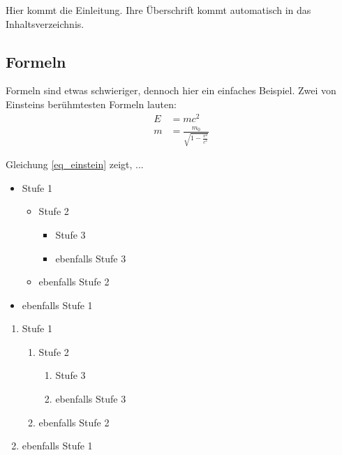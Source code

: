 \documentclass[twoside,12pt]{scrartcl}
\begin{document}
	\onehalfspacing
	
	
	Hier kommt die Einleitung. Ihre Überschrift kommt
	automatisch in das Inhaltsverzeichnis.
	
	\subsection{Formeln}
		
	Formeln sind etwas schwieriger, dennoch hier ein
	einfaches Beispiel.  Zwei von Einsteins
	berühmtesten Formeln lauten:
	\begin{align}
	E &= mc^2          \label{eq_einstein}                        \\
	m &= \frac{m_0}{\sqrt{1-\frac{v^2}{c^2}}}
	\end{align}
	
	
	Gleichung \eqref{eq_einstein} zeigt, ...
	
	\begin{itemize}
		\item Stufe 1
		\begin{itemize}
			\item Stufe 2
			\begin{itemize}
				\item Stufe 3
				\item ebenfalls Stufe 3
			\end{itemize}
			\item ebenfalls Stufe 2
		\end{itemize}
		\item ebenfalls Stufe 1
	\end{itemize}
	
		
	\begin{enumerate}
		\item Stufe 1
		\begin{enumerate}
			\item Stufe 2
			\begin{enumerate}
				\item Stufe 3
				\item ebenfalls Stufe 3
			\end{enumerate}
			\item ebenfalls Stufe 2
		\end{enumerate}
		\item ebenfalls Stufe 1
	\end{enumerate}
	
	
	
\end{document}
